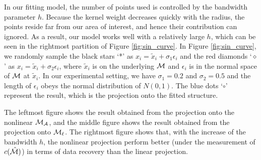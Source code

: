 \documentclass{article}
\theoremstyle{remark}
\begin{document}
In our fitting model, the number of points used is controlled by the bandwidth parameter $h$. Because the kernel weight decreases quickly with the radius, the points reside far from our area of interest, and hence their contribution can ignored. As a result, our model works well with a relatively large $h$, which can be seen in the rightmost partition of Figure \eqref{fig:sin_curve}. In Figure \eqref{fig:sin_curve}, we randomly sample the black stars `*' as $x_i = \tilde{x}_i+\sigma_1\epsilon_i$ and the red diamonds `$\diamond$' as $x_i = \tilde{x}_i+\sigma_2\epsilon_i$, where $\tilde{x}_i$ is on the underlying $\cal M$ and $\epsilon_i$ is in the normal space of $\cal M$ at $\tilde{x}_i$. In our experimental setting, we have $\sigma_1=0.2$ and $\sigma_2=0.5$ and the length of $\epsilon_i$ obeys the normal distribution of $N(0,1)$. The blue dots `$\circ$' represent the result, which is the projection onto the fitted structure. 

The leftmost figure shows the result obtained from the projection onto the nonlinear $\cal M_A$, and the middle figure shows the result obtained from the projection onto $\cal M_\ell$.
The rightmost figure shows that, with the increase of the bandwidth $h$, the nonlinear projection perform  better (under the measurement of $c({\hat{\cal M}})$) in terms of data recovery than the linear projection.

\end{document}
